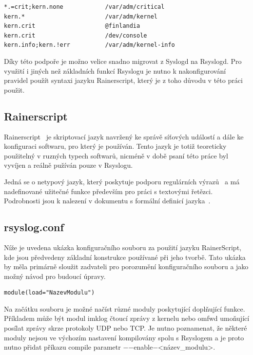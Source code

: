 \documentclass[thesis=B,czech]{FITthesis}[2012/06/26]
\begin{document}
\begin{lstlisting}[style=AshStyle]
*.=crit;kern.none            /var/adm/critical
kern.*                       /var/adm/kernel
kern.crit                    @finlandia
kern.crit                    /dev/console
kern.info;kern.!err          /var/adm/kernel-info
\end{lstlisting}

Díky této podpoře je možno velice snadno migrovat z Syslogd na Rsyslogd.
Pro využití i jiných než základních funkcí Rsyslogu je nutno k nakonfigurování pravidel použít syntaxi jazyku Rainerscript, který je z toho důvodu v této práci použit.

\subsection{Rainerscript}
Rainerscript~\cite{RainerScript} je skriptovací jazyk navržený ke správě síťových událostí a dále ke konfiguraci softwaru, pro který je používán.
Tento jazyk je totiž teoreticky použitelný v ruzných typech softwarů, nicméně v době psaní této práce byl vyvíjen a reálně pužíván pouze v Rsyslogu.

Jedná se o netypový jazyk, který poskytuje podporu regulárních výrazů~\cite{RainerScriptPropertyReplacer} a má nadefinované užitečné funkce především pro práci s textovými řetězci.
Podrobnosti jsou k nalezení v dokumentu s formální definicí jazyka~\cite{RainerScriptFormalDefinition}.

\subsection{rsyslog.conf}
Níže je uvedena ukázka konfiguračního souboru za použití jazyku RainerScript, kde jsou předvedeny základní konstrukce používané při jeho tvorbě. Tato ukázka by měla primárně sloužit zadvateli pro porozumění konfiguračního souboru a jako možný návod pro budoucí úpravy.

\begin{lstlisting}[style=RainerScriptSimpleStyle]
module(load="NazevModulu")
\end{lstlisting}
Na začátku souboru je možné načíst různé moduly poskytující doplňující funkce. Příkladem může být modul imklog čtoucí zprávy z kernelu nebo omfwd umoňující posílat zprávy skrze protokoly UDP nebo TCP. Je nutno poznamenat, že některé moduly nejsou ve výchozím nastavení kompilovány spolu s Rsyslogem a je proto nutno přidat příkazu compile parametr $-$$-$enable$-$<název\_modulu>.
\end{document}
